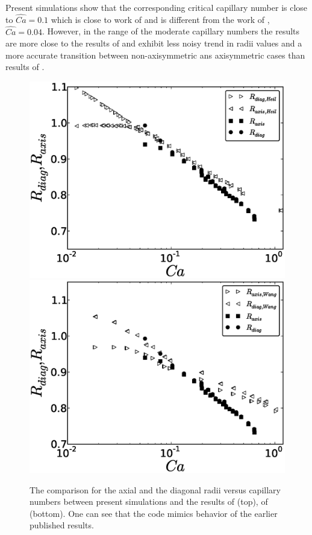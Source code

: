 \documentclass{article}
\begin{document}
Present simulations show that the corresponding critical capillary number is close to
$\widehat{Ca}=0.1$ which is close to work of \citet{wang-non-circular} and is different from the
work of \citet{heil-threedim}, $\widehat{Ca}=0.04$. However, in the range of the moderate
capillary numbers the results are more close to the results of \citet{heil-threedim} and exhibit
less noisy trend in radii values and a more accurate transition between non-axisymmetric ans
axisymmetric cases than results of \cite{wang-non-circular}. 
\begin{figure}[ht]
\includegraphics[width=\textwidth]{Figures/capillaries_comparison_heil.eps}\\
\includegraphics[width=\textwidth]{Figures/capillaries_comparison_wang.eps}\\
\caption{The comparison for the axial and the diagonal radii
versus capillary numbers between present simulations and the results of \citet{heil-threedim}
(top), of \citet{wang-non-circular} (bottom). One can see that
the code mimics
behavior of the earlier published results.  \label{fig:capillary:comparison}} 
\end{figure}
\end{document}
